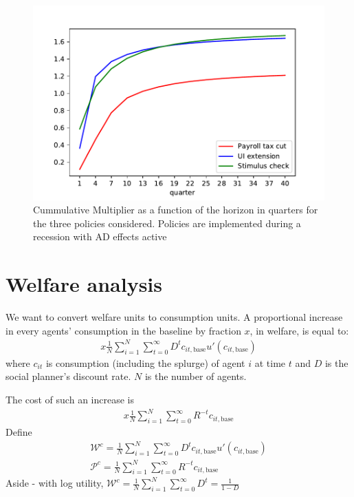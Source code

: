 \documentclass[11pt]{article}
\begin{document}
	\begin{figure}
		\centering
		\includegraphics[width=0.8\linewidth]{../Code/HA-Models/FromPandemicCode/Figures/Cummulative_multipliers}
		\caption{Cummulative Multiplier as a function of the horizon in quarters for the three policies considered. Policies are implemented during a recession with AD effects active}
		\label{fig:cummulativemultipliers}
	\end{figure}
	
	\FloatBarrier
	\section{Welfare analysis}
	
	We want to convert welfare units to consumption units. A proportional increase in every agents' consumption in the baseline by fraction $x$, in welfare, is equal to:
	\begin{align}
	x\frac{1}{N}\sum_{i=1}^{N} \sum_{t=0}^{\infty} D^t c_{it,\text{base}} u'(c_{it,\text{base}})
	\end{align}
	where $c_{it}$ is consumption (including the splurge) of agent $i$ at time $t$ and $D$ is the social planner's discount rate. $N$ is the number of agents.
	
	
	The cost of such an increase is
	\begin{align}
	x\frac{1}{N}\sum_{i=1}^{N} \sum_{t=0}^{\infty} R^{-t} c_{it,\text{base}}
	\end{align}
	Define
	\begin{align}
	\mathcal{W}^c =\frac{1}{N}\sum_{i=1}^{N} \sum_{t=0}^{\infty} D^t c_{it,\text{base}} u'(c_{it,\text{base}}) \\
	\mathcal{P}^c = \frac{1}{N}\sum_{i=1}^{N} \sum_{t=0}^{\infty} R^{-t} c_{it,\text{base}}
	\end{align}
	Aside - with log utility, $\mathcal{W}^c =\frac{1}{N}\sum_{i=1}^{N} \sum_{t=0}^{\infty} D^t = \frac{1}{1-D}$
	
\end{document}
